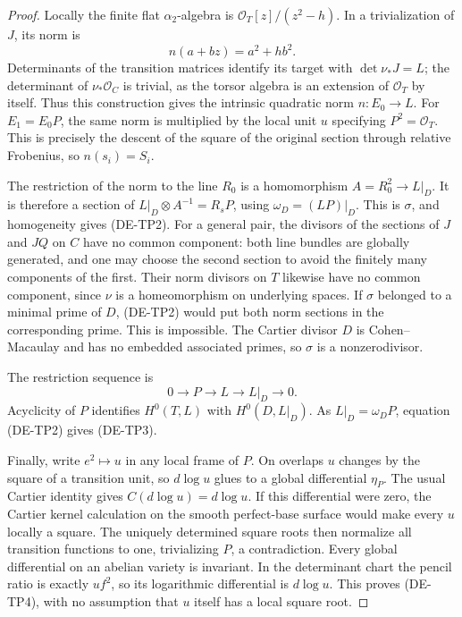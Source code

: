 \begin{proof}
Locally the finite flat $\alpha_2$-algebra is
$\mathcal O_T[z]/(z^2-h)$. In a trivialization of $J$, its norm is
\[
                         n(a+bz)=a^2+h b^2.
\]
Determinants of the transition matrices identify its target with
$\det\nu_*J=L$; the determinant of $\nu_*\mathcal O_C$ is trivial,
as the torsor algebra is an extension of $\mathcal O_T$ by itself.
Thus this construction gives the intrinsic quadratic norm
$n:E_0\to L$. For $E_1=E_0P$, the same norm is multiplied by the
local unit $u$ specifying $P^2=\mathcal O_T$. This is precisely the
descent of the square of the original section through relative
Frobenius, so $n(s_i)=S_i$.

The restriction of the norm to the line $R_0$ is a homomorphism
$A=R_0^2\to L|_D$. It is therefore a section of
$L|_D\otimes A^{-1}=R_sP$, using $\omega_D=(LP)|_D$.
This is $\sigma$, and homogeneity gives (DE-TP2). For a general
pair, the divisors of the sections of $J$ and $JQ$ on $C$ have no
common component: both line bundles are globally generated, and
one may choose the second section to avoid the finitely many
components of the first. Their norm divisors on $T$ likewise have
no common component, since $\nu$ is a homeomorphism on underlying
spaces. If $\sigma$ belonged to a minimal prime of $D$, (DE-TP2)
would put both norm sections in the corresponding prime. This is
impossible. The Cartier divisor $D$ is Cohen--Macaulay and has no
embedded associated primes, so $\sigma$ is a nonzerodivisor.

The restriction sequence is
\[
                 0\longrightarrow P\longrightarrow L
                    \longrightarrow L|_D\longrightarrow0.
\]
Acyclicity of $P$ identifies $H^0(T,L)$ with $H^0(D,L|_D)$.
As $L|_D=\omega_DP$, equation (DE-TP2) gives (DE-TP3).

Finally, write $e^2\mapsto u$ in any local frame of $P$.
On overlaps $u$ changes by the square of a transition unit,
so $d\log u$ glues to a global differential $\eta_P$.
The usual Cartier identity gives $C(d\log u)=d\log u$.
If this differential were zero, the Cartier kernel calculation
on the smooth perfect-base surface would make every $u$ locally
a square. The uniquely determined square roots then normalize
all transition functions to one, trivializing $P$, a contradiction.
Every global differential on an abelian variety is invariant.
In the determinant chart the pencil ratio is exactly $u f^2$,
so its logarithmic differential is $d\log u$. This proves
(DE-TP4), with no assumption that $u$ itself has a local square root.
\end{proof}

